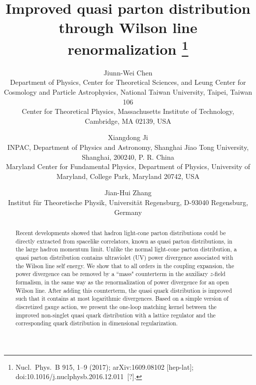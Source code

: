 \documentclass[11pt]{article}
\title{Improved quasi parton distribution through Wilson line renormalization%
\thanks{Nucl.\ Phys.\ B 915, 1--9 (2017); arXiv:1609.08102 [hep-lat]; doi:10.1016/j.nuclphysb.2016.12.011~[?].}}
\author{
Jiunn-Wei Chen\\[2pt]
{\small Department of Physics, Center for Theoretical Sciences, and Leung Center for Cosmology and Particle Astrophysics, National Taiwan University, Taipei, Taiwan 106}\\[2pt]
{\small Center for Theoretical Physics, Massachusetts Institute of Technology, Cambridge, MA 02139, USA}
\and
Xiangdong Ji\\[2pt]
{\small INPAC, Department of Physics and Astronomy, Shanghai Jiao Tong University, Shanghai, 200240, P. R. China}\\[2pt]
{\small Maryland Center for Fundamental Physics, Department of Physics, University of Maryland, College Park, Maryland 20742, USA}
\and
Jian-Hui Zhang\\[2pt]
{\small Institut f\"ur Theoretische Physik, Universit\"at Regensburg, D-93040 Regensburg, Germany}
}
\date{}
\begin{document}
\maketitle

\begin{abstract}
Recent developments showed that hadron light-cone parton distributions could be directly extracted from spacelike correlators, known as quasi parton distributions, in the large hadron momentum limit.
Unlike the normal light-cone parton distribution, a quasi parton distribution contains ultraviolet (UV) power divergence associated with the Wilson line self energy.
We show that to all orders in the coupling expansion, the power divergence can be removed by a ``mass" counterterm in the auxiliary $z$-field formalism, in the same way as the renormalization of power divergence for an open Wilson line. After adding this counterterm, the quasi quark distribution is improved such that it contains at most logarithmic divergences. Based on a simple version of discretized gauge action, we present the one-loop matching kernel between the improved non-singlet quasi quark distribution with a lattice regulator and the corresponding quark distribution in dimensional regularization.
\end{abstract}






\end{document}
